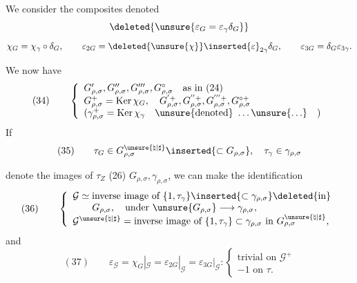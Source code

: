 We consider the composites
denoted
\[
\deleted{\unsure{\varepsilon_G=\varepsilon_\gamma\delta_G}}
\]
\[
\chi_G=\chi_\gamma\circ\delta_G,\qquad
\varepsilon_{2G}=\deleted{\unsure{\chi}}\inserted{\varepsilon}_{2\gamma}\delta_G,\qquad
\varepsilon_{3G}=\delta_G\varepsilon_{3\gamma}.
\]

We now have
\[
(34)\qquad
\left\{
\begin{array}{l}
G'_{\rho,\sigma},G''_{\rho,\sigma},G'''_{\rho,\sigma},G^\circ_{\rho,\sigma}
\quad\text{as in }(24)\\
G^+_{\rho,\sigma}=\operatorname{Ker}\chi_G,\quad
G^{'+}_{\rho,\sigma},G^{''+}_{\rho,\sigma},G^{'''+}_{\rho,\sigma},G^{\circ+}_{\rho,\sigma}\\
(\gamma^+_{\rho,\sigma}=\operatorname{Ker}\chi_\gamma\quad
\text{\unsure{denoted}}\ \ldots\unsure{\ldots}\quad)
\end{array}
\right.
\]
If
\[
(35)\qquad
\tau_G\in G_{\rho,\sigma}^{\unsure{\natural|\sharp}}
\inserted{\subset G_{\rho,\sigma}},\quad
\tau_\gamma\in\gamma_{\rho,\sigma}
\]

denote the images of $\tau_Z$ (26) 
$G_{\rho,\sigma},\gamma_{\rho,\sigma}$,
we can make the identification
\[
(36)\qquad
\left\{
\begin{array}{l}
\mathcal G\simeq\text{inverse image of }\{1,\tau_\gamma\}
\inserted{\subset\gamma_{\rho,\sigma}}\deleted{\text{in}}\\
\qquad G_{\rho,\sigma},\quad\text{under }\unsure{G_{\rho,\sigma}}
\longrightarrow\gamma_{\rho,\sigma},\\
\mathcal G^{\unsure{\natural|\sharp}}
=\text{inverse image of }\{1,\tau_\gamma\}\subset\gamma_{\rho,\sigma}
\text{ in }G_{\rho,\sigma}^{\unsure{\natural|\sharp}},
\end{array}
\right.
\]
and
\[
(37)\qquad
\varepsilon_{\mathcal G}
=\chi_G|_{\mathcal G}
=\varepsilon_{2G}|_{\mathcal G}
=\varepsilon_{3G}|_{\mathcal G}
:\left\{
\begin{array}{l}
\text{trivial on }\mathcal G^+\\
-1\text{ on }\tau.
\end{array}
\right.
\]


